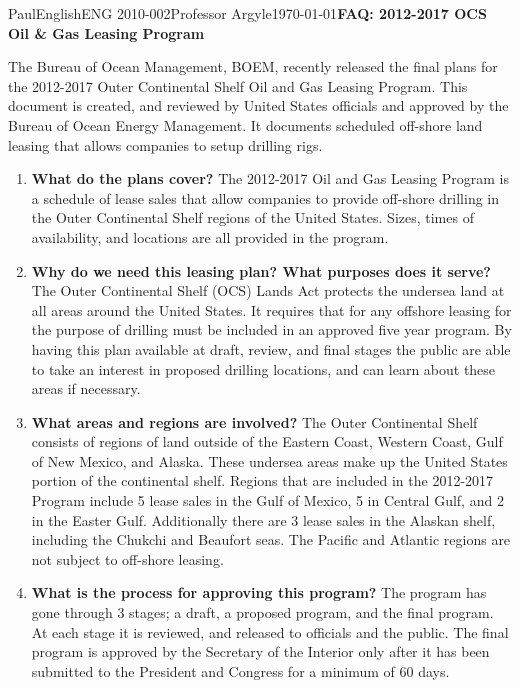 \documentclass[12pt,letterpaper]{article}
\begin{document}
\begin{mla}{Paul}{English}{ENG 2010-002}{Professor Argyle}{\today}{\textbf{FAQ: 2012-2017 OCS Oil \& Gas Leasing Program}}

The Bureau of Ocean Management, BOEM, recently released the final plans for the 2012-2017 Outer Continental Shelf Oil and Gas Leasing Program. This document is created, and reviewed by United States officials and approved by the Bureau of Ocean Energy Management. It documents scheduled off-shore land leasing that allows companies to setup drilling rigs.

\begin{enumerate}
\item \textbf{What do the plans cover?}\newline
The 2012-2017 Oil and Gas Leasing Program is a schedule of lease sales that allow companies to provide off-shore drilling in the Outer Continental Shelf regions of the United States. Sizes, times of availability, and locations are all provided in the program. 

\item \textbf{Why do we need this leasing plan? What purposes does it serve?}\newline
The Outer Continental Shelf (OCS) Lands Act protects the undersea land at all areas around the United States. It requires that for any offshore leasing for the purpose of drilling must be included in an approved five year program. By having this plan available at draft, review, and final stages the public are able to take an interest in proposed drilling locations, and can learn about these areas if necessary.

\item \textbf{What areas and regions are involved?}\newline
The Outer Continental Shelf consists of regions of land outside of the Eastern Coast, Western Coast, Gulf of New Mexico, and Alaska. These undersea areas make up the United States portion of the continental shelf. Regions that are included in the 2012-2017 Program include 5 lease sales in the Gulf of Mexico, 5 in Central Gulf, and 2 in the Easter Gulf. Additionally there are 3 lease sales in the Alaskan shelf, including the Chukchi and Beaufort seas. The Pacific and Atlantic regions are not subject to off-shore leasing.

\item \textbf{What is the process for approving this program?}\newline
The program has gone through 3 stages; a draft, a proposed program, and the final program. At each stage it is reviewed, and released to officials and the public. The final program is approved by the Secretary of the Interior only after it has been submitted to the President and Congress for a minimum of 60 days.


\end{enumerate}
\end{mla}
\end{document}
